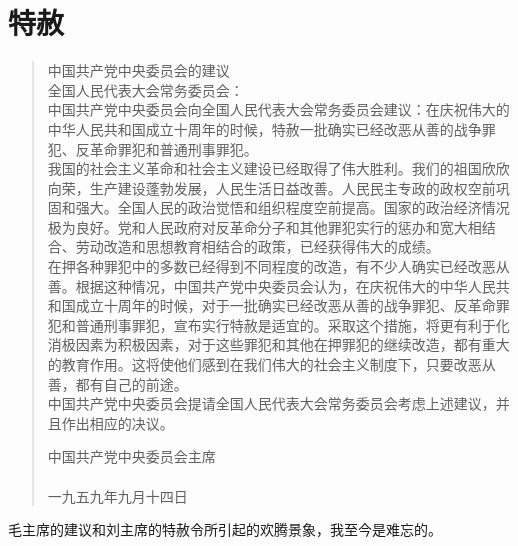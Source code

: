 \fancyhead[RO]{} %
\fancyhead[LE]{} %
\chapter*{特赦}
\thispagestyle{empty}
\begin{quote}
	中国共产党中央委员会的建议\\

全国人民代表大会常务委员会：\\

中国共产党中央委员会向全国人民代表大会常务委员会建议：在庆祝伟大的中华人民共和国成立十周年的时候，特赦一批确实已经改恶从善的战争罪犯、反革命罪犯和普通刑事罪犯。\\

我国的社会主义革命和社会主义建设已经取得了伟大胜利。我们的祖国欣欣向荣，生产建设蓬勃发展，人民生活日益改善。人民民主专政的政权空前巩固和强大。全国人民的政治觉悟和组织程度空前提高。国家的政治经济情况极为良好。党和人民政府对反革命分子和其他罪犯实行的惩办和宽大相结合、劳动改造和思想教育相结合的政策，已经获得伟大的成绩。\\

在押各种罪犯中的多数已经得到不同程度的改造，有不少人确实已经改恶从善。根据这种情况，中国共产党中央委员会认为，在庆祝伟大的中华人民共和国成立十周年的时候，对于一批确实已经改恶从善的战争罪犯、反革命罪犯和普通刑事罪犯，宣布实行特赦是适宜的。采取这个措施，将更有利于化消极因素为积极因素，对于这些罪犯和其他在押罪犯的继续改造，都有重大的教育作用。这将使他们感到在我们伟大的社会主义制度下，只要改恶从善，都有自己的前途。\\

中国共产党中央委员会提请全国人民代表大会常务委员会考虑上述建议，并且作出相应的决议。\\

\begin{flushright}
	中国共产党中央委员会主席\\

\\

一九五九年九月十四日\\
\end{flushright}
\end{quote}

毛主席的建议和刘主席的特赦令所引起的欢腾景象，我至今是难忘的。\\

